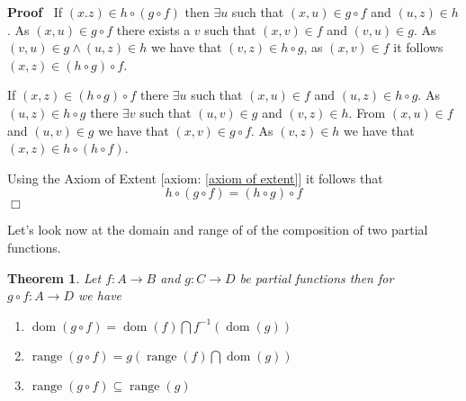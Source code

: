 \documentclass{book}
\newcommand{\tmop}[1]{\ensuremath{\operatorname{#1}}}
\newenvironment{proof}{\noindent\textbf{Proof\ }}{\hspace*{\fill}$\Box$\medskip}
\newtheorem{theorem}{Theorem}
\begin{document}
\begin{proof}
  If $(x.z) \in h \circ (g \circ f)$ then $\exists u$ such that $(x, u) \in g
  \circ f$ and $(u, z) \in h$. As $(x, u) \in g \circ f$ there exists a $v$
  such that $(x, v) \in f$ and $(v, u) \in g$. As $(v, u) \in g \wedge (u, z)
  \in h$ we have that $(v, z) \in h \circ g$, as $(x, v) \in f$ it follows
  $(x, z) \in (h \circ g) \circ f$.
  
  If $(x, z) \in (h \circ g) \circ f$ there $\exists u$ such that $(x, u) \in
  f$ and $(u, z) \in h \circ g$. As $(u, z) \in h \circ g$ there $\exists v$
  such that $(u, v) \in g$ and $(v, z) \in h$. From $(x, u) \in f$ and $(u, v)
  \in g$ we have that $(x, v) \in g \circ f$. As $(v, z) \in h$ we have that
  $(x, z) \in h \circ (h \circ f)$.
  
  Using the Axiom of Extent [axiom: \ref{axiom of extent}] it follows that
  \[ h \circ (g \circ f) = (h \circ g) \circ f \]
\end{proof}

Let's look now at the domain and range of of the composition of two partial
functions.

\begin{theorem}
  \label{partial function domain range composition}Let $f : A \rightarrow B$
  and $g : C \rightarrow D$ be partial functions then for $g \circ f : A
  \rightarrow D$ we have
  \begin{enumerate}
    \item $\tmop{dom} (g \circ f) = \tmop{dom} (f) \bigcap f^{- 1} (\tmop{dom}
    (g))$
    
    \item $\tmop{range} (g \circ f) = g \left( \tmop{range} (f) \bigcap
    \tmop{dom} (g) \right)$
    
    \item $\tmop{range} (g \circ f) \subseteq \tmop{range} (g)$
  \end{enumerate}
\end{theorem}
\end{document}
